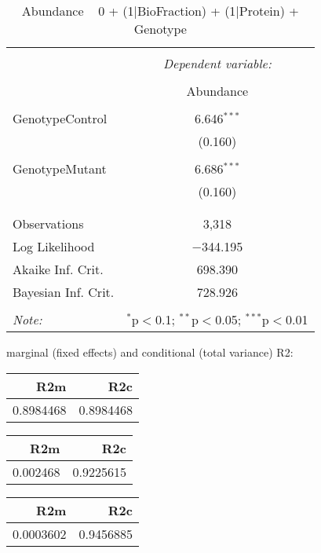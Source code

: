 \documentclass[11pt]{report}
\begin{document}
\begin{table}[!htbp] \centering 
  \caption{Abundance ~ 0 + (1|BioFraction) + (1|Protein) + Genotype} 
  \label{} 
\begin{tabular}{@{\extracolsep{5pt}}lc} 
\\[-1.8ex]\hline 
\hline \\[-1.8ex] 
 & \multicolumn{1}{c}{\textit{Dependent variable:}} \\ 
\cline{2-2} 
\\[-1.8ex] & Abundance \\ 
\hline \\[-1.8ex] 
 GenotypeControl & 6.646$^{***}$ \\ 
  & (0.160) \\ 
  & \\ 
 GenotypeMutant & 6.686$^{***}$ \\ 
  & (0.160) \\ 
  & \\ 
\hline \\[-1.8ex] 
Observations & 3,318 \\ 
Log Likelihood & $-$344.195 \\ 
Akaike Inf. Crit. & 698.390 \\ 
Bayesian Inf. Crit. & 728.926 \\ 
\hline 
\hline \\[-1.8ex] 
\textit{Note:}  & \multicolumn{1}{r}{$^{*}$p$<$0.1; $^{**}$p$<$0.05; $^{***}$p$<$0.01} \\ 
\end{tabular} 
\end{table} 
marginal (fixed effects) and conditional (total variance) R2:

\begin{tabular}{r|r}
\hline
R2m & R2c\\
\hline
0.8984468 & 0.8984468\\
\hline
\end{tabular}

\begin{tabular}{r|r}
\hline
R2m & R2c\\
\hline
0.002468 & 0.9225615\\
\hline
\end{tabular}

\begin{tabular}{r|r}
\hline
R2m & R2c\\
\hline
0.0003602 & 0.9456885\\
\hline
\end{tabular}
\end{document}
